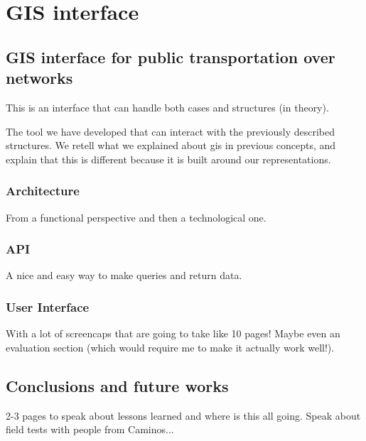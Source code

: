 \documentclass[a4paper,10pt,twoside]{book}
\begin{document}
\part{GIS interface}
	\chapter{GIS interface for public transportation over networks}
	This is an interface that can handle both cases and structures (in theory).
	
	The tool we have developed that can interact with the previously described structures. We retell what we explained about \gls{gis} in previous concepts, and explain that this is different because it is built around our representations.
	
	\section{Architecture}
	From a functional perspective and then a technological one.
	
	\section{API}
	A nice and easy way to make queries and return data.
	
	\section{User Interface}
	With a lot of screencaps that are going to take like 10 pages! Maybe even an evaluation section (which would require me to make it actually work well!).
	
\chapter{ Conclusions and future works}
	2-3 pages to speak about lessons learned and where is this all going. Speak about field tests with people from Caminos...

% 



\vfill \pagebreak \thispagestyle{empty} \mbox{}
\vfill \pagebreak \mbox{} \thispagestyle{empty}
\end{document}
